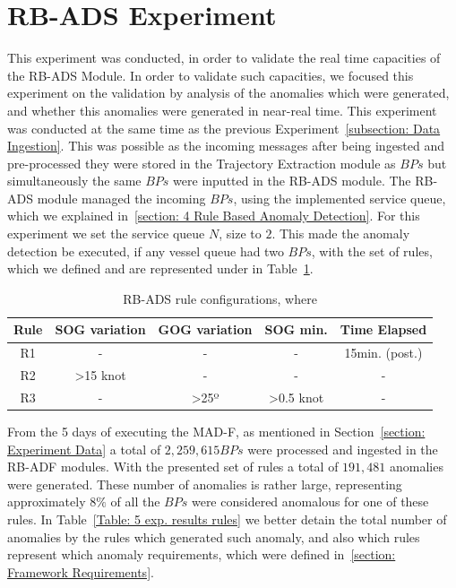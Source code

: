 \section{RB-ADS Experiment}
\label{section: RB-ADS Experiment}
This experiment was conducted, in order to validate the real time capacities of the RB-ADS Module. In order to validate such capacities, we focused this experiment on the validation by analysis of the anomalies which were generated, and whether this anomalies were generated in near-real time.
This experiment was conducted at the same time as the previous Experiment~\ref{subsection: Data Ingestion}. This was possible as the incoming messages after being ingested and pre-processed they were stored in the Trajectory Extraction module as $BPs$ but simultaneously the same $BPs$ were inputted in the RB-ADS module.
The RB-ADS module managed the incoming $BPs$, using the implemented service queue, which we explained in~\ref{section: 4 Rule Based Anomaly Detection}. For this experiment we set the service queue $N$, size to $2$. This made the anomaly detection be executed, if any vessel queue had two $BPs$, with the set of rules, which we defined and are represented under in Table~\ref{Table: 5 exp. RB-ADS rules}. 

\begin{table}[H]
\centering
\caption{RB-ADS rule configurations, where }
\label{Table: 5 exp. RB-ADS rules}
\begin{tabular}{@{}ccccc@{}}
\toprule
Rule & SOG variation & GOG variation & SOG min. & Time Elapsed \\ \midrule
R1 & - & - & - & 15min. (post.) \\
R2 & \textgreater{}15 knot & - & - & - \\
R3 & - & \textgreater 25º & \textgreater 0.5 knot & - \\ \bottomrule
\end{tabular}
\end{table}

From the 5 days of executing the MAD-F, as mentioned in Section~\ref{section: Experiment Data} a total of $2,259,615 BPs$ were processed and ingested in the RB-ADF modules. With the presented set of rules a total of $191,481$ anomalies were generated. These number of anomalies is rather large, representing approximately $8\%$ of all the $BPs$ were considered anomalous for one of these rules. In Table~\ref{Table: 5 exp. results rules} we better detain the total number of anomalies by the rules which generated such anomaly, and also which rules represent which anomaly requirements, which were defined in~\ref{section: Framework Requirements}.

